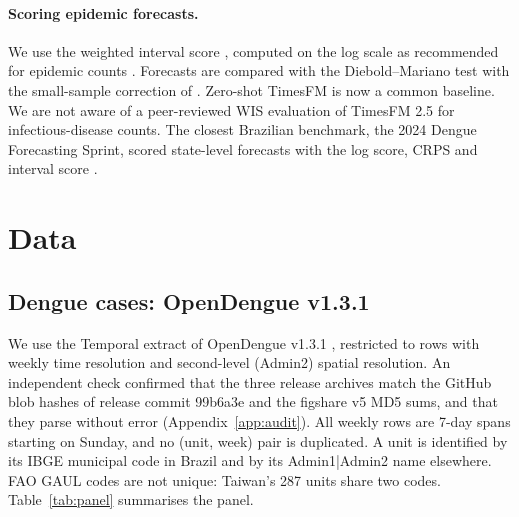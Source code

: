 \documentclass[11pt]{article}
\begin{document}
\paragraph{Scoring epidemic forecasts.}
We use the weighted interval score \citep{bracher2021wis}, computed on the log scale as recommended
for epidemic counts \citep{bosse2023transformed}. Forecasts are compared with the Diebold--Mariano test
\citep{diebold1995comparing} with the small-sample correction of \citet{harvey1997testing}.
Zero-shot TimesFM \citep{das2024timesfm} is now a common baseline. We are not aware of a
peer-reviewed WIS evaluation of TimesFM 2.5 for infectious-disease counts.
The closest Brazilian benchmark, the 2024 Dengue Forecasting Sprint, scored state-level forecasts
with the log score, CRPS and interval score \citep{araujo2025sprint}.

\section{Data}
\label{sec:data}

\subsection{Dengue cases: OpenDengue v1.3.1}
We use the Temporal extract of OpenDengue v1.3.1 \citep{clarke2024opendengue,opendengue131},
restricted to rows with weekly time resolution and second-level (Admin2) spatial resolution. An
independent check confirmed that the three release archives match the GitHub blob hashes of release commit 99b6a3e
and the figshare v5 MD5 sums, and that they parse without error
(Appendix~\ref{app:audit}). All weekly rows are 7-day spans starting on Sunday, and no (unit, week)
pair is duplicated. A unit is identified by its IBGE municipal code in Brazil and by its
Admin1|Admin2 name elsewhere. FAO GAUL codes are not unique: Taiwan's 287 units share two codes.
Table~\ref{tab:panel} summarises the panel.
\end{document}
